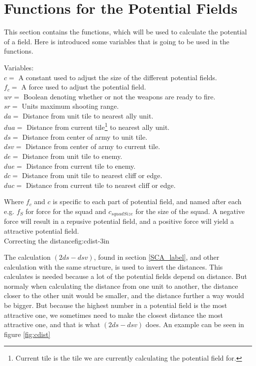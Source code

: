 \section{Functions for the Potential Fields}
	This section contains the functions, which will be used to calculate the potential of a field. Here is introduced some variables that 
	is going to be used in the functions.
	
	\label{cha3_variables}
	Variables:\\
	$c =$ A constant used to adjust the size of the different potential fields.\\ 
	$f_c =$ A force used to adjust the potential field.\\
	$wr =$ Boolean denoting whether or not the weapons are ready to fire.\\
	$sr =$ Units maximum shooting range.\\
	$da =$ Distance from unit tile to nearest ally unit.\\
	$dua =$ Distance from current tile\footnote{Current tile is the tile we are currently calculating the potential field for.} to nearest ally unit.\\
	$ds =$ Distance from center of army to unit tile.\\
	$dsv =$ Distance from center of army to current tile.\\
	$de =$ Distance from unit tile to enemy.\\
	$due =$ Distance from current tile to enemy.\\
	$dc =$ Distance from unit tile to nearest cliff or edge. \\
	$duc =$ Distance from current tile to nearest cliff or edge. 
	
	
	
	Where $f_c$ and $c$ is specific to each part of potential field, and named after each e.g. $f_{S}$ for force for the squad and $c_{squadSize}$ for the size of the squad. A negative force will result in a repusive potential field, and a positive force will yield a attractive potential field.\\
	
		    {Correcting the distance}{fig:cdist}{-3in}
			
	The calculation $(2ds - dsv)$, found in section \ref{SCA_label}, and other calculation with the same structure, is used to invert the distances. This calculates is needed because a lot of the potential fields depend on distance. But normaly when calculating the distance from one unit to another, the distance closer to the other unit would be smaller, and the distance further a way would be bigger. But because the highest number in a potential field is the most attractive one, we sometimes need to make the closest distance the most attractive one, and that is what $(2ds - dsv)$ does. An example can be seen in figure \ref{fig:cdist}
	
